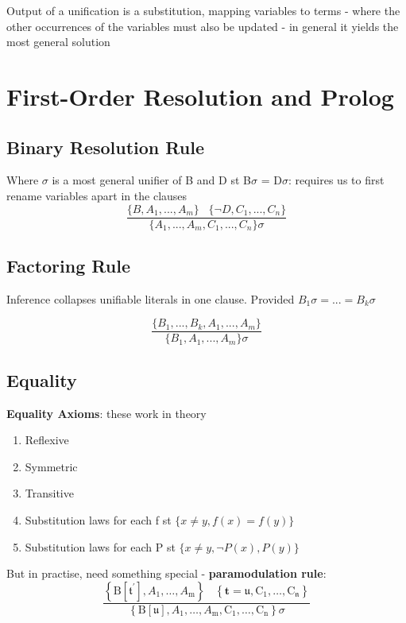 \documentclass{article}
\begin{document}
Output of a unification is a substitution, mapping variables to terms - where the other occurrences of the variables must also be updated - in general it yields the most general solution

\section{First-Order Resolution and Prolog}
\subsection{Binary Resolution Rule}
Where $\sigma$ is a most general unifier of B and D st B$\sigma$ = D$\sigma$: requires us to first rename variables apart in the clauses
$$\frac{\{ B, A_{1}, ..., A_{m} \} \; \; \; \{ \neg D, C_{1}, ..., C_{n} \}}{\{ A_{1}, ..., A_{m}, C_{1}, ..., C_{n} \} \sigma}$$


\subsection{Factoring Rule}
Inference collapses unifiable literals in one clause. Provided $B_{1} \sigma = ... = B_{k} \sigma$

$$\frac{\{ B_{1}, ..., B_{k}, A_{1}, ..., A_{m} \}}{\{ B_{1}, A_{1}, ..., A_{m} \} \sigma}$$

\subsection{Equality}
\textbf{Equality Axioms}: these work in theory
\begin{enumerate}
    \item Reflexive
    \item Symmetric
    \item Transitive
    \item Substitution laws for each f st $\{ x \neq y, f(x) = f(y) \}$
    \item Substitution laws for each P st $\{ x \neq y, \neg P(x), P(y) \}$
\end{enumerate}

But in practise, need something special - \textbf{paramodulation rule}:
$$\frac{\left\{\mathrm{B}\left[\mathfrak{t}^{\prime}\right], A_{1}, \dots, A_{\mathrm{m}}\right\} \; \; \; \left\{\mathbf{t}=\mathfrak{u}, \mathrm{C}_{1}, \ldots, \mathrm{C}_{\mathfrak{n}}\right\}}{\left\{\mathrm{B}[\mathfrak{u}], A_{1}, \ldots, A_{\mathrm{m}}, \mathrm{C}_{1}, \ldots, \mathrm{C}_{\mathrm{n}}\right\} \sigma}$$
\end{document}
